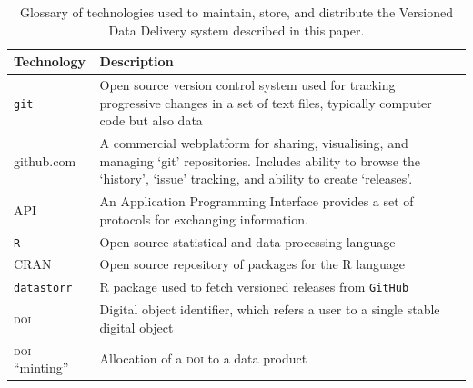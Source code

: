 \documentclass[a4paper,11pt]{article}
\begin{document}
\newpage

\begin{table}[h!]
\centering
\caption{Glossary of technologies used to maintain, store, and distribute the Versioned Data Delivery system described in this paper.}
{\footnotesize
\vspace{1cm}
  \begin{tabular}{p{5cm}p{10cm}}
  \hline
  \textbf{Technology} & \textbf{Description} \\\hline
   \texttt{git} & Open source version control system used for tracking progressive changes in a set of text files, typically computer code but also data\\
   github.com & A commercial webplatform for sharing, visualising, and managing `git' repositories. Includes ability to browse the `history', `issue' tracking, and ability to create `releases'.\\
  \textsc{API}   & An Application Programming Interface provides a set of protocols for exchanging information.\\
   \texttt{R}     &  Open source statistical and data processing language \\
   \textsc{CRAN}  &  Open source repository of packages for the R language \\
   \texttt{datastorr} & R package used to fetch versioned releases from \texttt{GitHub}  \\
   \textsc{doi} & Digital object identifier, which refers a user to a single stable digital object \\
   \textsc{doi} ``minting'' & Allocation of a \textsc{doi} to a data product\\
   \hline
  \end{tabular}
  }
\label{tab:technologies}
\end{table}

\newpage
\end{document}
